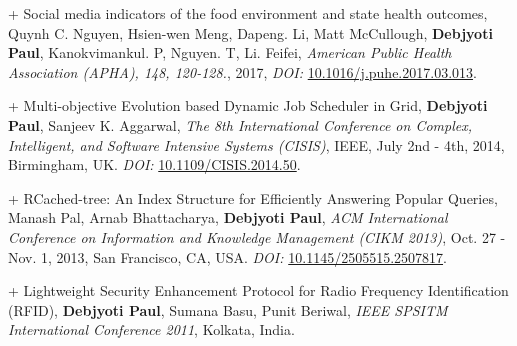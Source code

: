 \documentclass[8pt]{article}
\makeatletter
\newlength{\bibhang}
\newlength{\bibsep}
 {\@listi \global\bibsep\itemsep \global\advance\bibsep by\parsep}
\newenvironment{bibsection}%
        {\vspace{-\baselineskip}\begin{list}{}{%
       \setlength{\leftmargin}{\bibhang}%
       \setlength{\itemindent}{-\leftmargin}%
       \setlength{\itemsep}{\bibsep}%
       \setlength{\parsep}{\z@}%
        \setlength{\partopsep}{0pt}%
        \setlength{\topsep}{0pt}}}
        {\end{list}\vspace{-.6\baselineskip}}
\renewcommand{\section}[2]%
        {\pagebreak[2]\vspace{0.7\baselineskip}%
         \phantomsection\addcontentsline{toc}{section}{#1}%
         \hspace{0in}%
         \marginpar{
         \raggedright \scshape #1}#2}
\newenvironment{innerlist}[1][\enskip\textbullet]%
        {\begin{compactitem}[#1]}{\end{compactitem}}
\makeatother
\begin{document}
\begin{bibsection}
\item[+] Social media indicators of the food environment and state health outcomes, Quynh C. Nguyen, Hsien-wen Meng, Dapeng. Li, Matt McCullough, \textbf{Debjyoti Paul}, Kanokvimankul. P, Nguyen. T, Li. Feifei, \emph{ American Public Health Association (APHA), 148, 120-128.}, 2017, \textit{DOI:} \href{https://dx.doi.org/10.1016/j.puhe.2017.03.013}{10.1016/j.puhe.2017.03.013}.
\item[+] Multi-objective Evolution based Dynamic Job Scheduler in Grid, \textbf{Debjyoti Paul}, Sanjeev K. Aggarwal,  \emph{The 8th International Conference on Complex, Intelligent, and Software Intensive Systems (CISIS)}, IEEE, July 2nd - 4th, 2014, Birmingham, UK. \textit{DOI:} \href{https://dx.doi.org/10.1109/CISIS.2014.50}{10.1109/CISIS.2014.50}.
\item[+] RCached-tree: An Index Structure for Efficiently Answering Popular Queries, Manash Pal, Arnab Bhattacharya, \textbf{Debjyoti Paul}, \emph{ACM International Conference on Information and Knowledge Management (CIKM 2013)}, Oct. 27 - Nov. 1, 2013, San Francisco, CA, USA. \textit{DOI:}  \href{https://dx.doi.org/10.1145/2505515.2507817}{10.1145/2505515.2507817}.
\item[+] Lightweight Security Enhancement Protocol for Radio Frequency Identification (RFID),  \textbf{Debjyoti Paul}, Sumana Basu, Punit Beriwal, \emph{IEEE SPSITM International Conference 2011}, Kolkata, India.
\end{bibsection}


\end{document}
